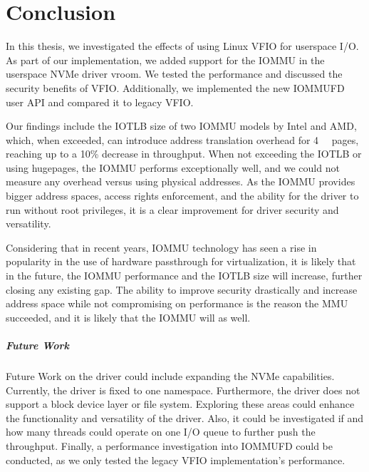 \chapter{Conclusion}
In this thesis, we investigated the effects of using Linux VFIO for userspace I/O. As part of our implementation, we added support for the IOMMU in the userspace NVMe driver vroom. We tested the performance and discussed the security benefits of VFIO. Additionally, we implemented the new IOMMUFD user API and compared it to legacy VFIO.

Our findings include the IOTLB size of two IOMMU models by Intel and AMD, which, when exceeded, can introduce address translation overhead for \qty{4}{\kibi\byte} pages, reaching up to a 10\% decrease in throughput.
When not exceeding the IOTLB or using hugepages, the IOMMU performs exceptionally well, and we could not measure any overhead versus using physical addresses.
As the IOMMU provides bigger address spaces, access rights enforcement, and the ability for the driver to run without root privileges, it is a clear improvement for driver security and versatility.

Considering that in recent years, IOMMU technology has seen a rise in popularity in the use of hardware passthrough for virtualization, it is likely that in the future, the IOMMU performance and the IOTLB size will increase, further closing any existing gap. The ability to improve security drastically and increase address space while not compromising on performance is the reason the MMU succeeded, and it is likely that the IOMMU will as well.

\paragraph{Future Work}
Future Work on the driver could include expanding the NVMe capabilities. Currently, the driver is fixed to one namespace. Furthermore, the driver does not support a block device layer or file system. Exploring these areas could enhance the functionality and versatility of the driver.
Also, it could be investigated if and how many threads could operate on one I/O queue to further push the throughput. Finally, a performance investigation into IOMMUFD could be conducted, as we only tested the legacy VFIO implementation's performance.